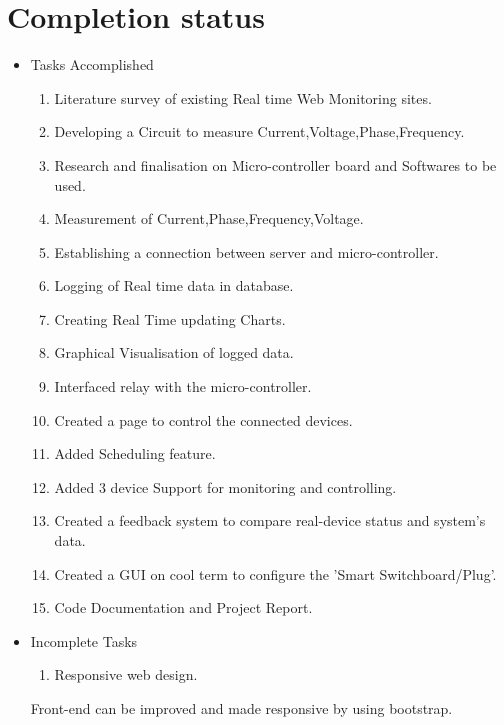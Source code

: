 \documentclass[a4paper,12pt,oneside]{book}
\begin{document}
\section{Completion status}
\begin{itemize}
	\item{Tasks Accomplished}
	\setlength\itemsep{0.2cm}
	\begin{enumerate}
		\item{Literature survey of existing Real time Web Monitoring sites. }    
		\item{Developing a Circuit to measure Current,Voltage,Phase,Frequency.}
		\item{Research and finalisation on Micro-controller board and Softwares to be used.}
		\item{Measurement of Current,Phase,Frequency,Voltage.}
		\item{Establishing a connection between server and micro-controller.}
		\item{Logging of Real time data in database.}
		\item{Creating Real Time updating Charts.}
		\item{Graphical Visualisation of logged data.}
		\item{Interfaced relay with the micro-controller.}
		\item{Created a page to control the connected devices.}
		\item{Added Scheduling feature. }
		\item{Added 3 device Support for monitoring and controlling.}
		\item{Created a feedback system to compare real-device status and system's  data.}
		\item{Created a GUI on cool term to configure the 'Smart Switchboard/Plug'.}
		\item{Code Documentation and Project Report.}
	\end{enumerate}
	\item{Incomplete Tasks}
	\begin{enumerate}
		\item{Responsive web design. }
	\end{enumerate}
	\par Front-end can be improved and made responsive by using bootstrap.   
\end{itemize}

\newpage
\end{document}
